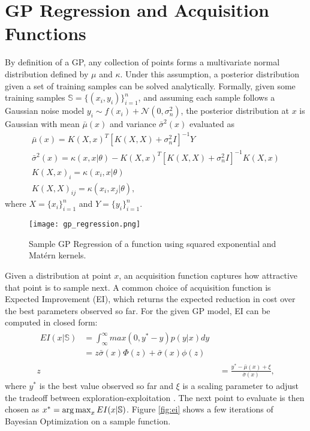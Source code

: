 \section{GP Regression and Acquisition Functions}
\label{gp_acq}
By definition of a GP, any collection of points forms a multivariate normal distribution defined by $\mu$ and $\kappa$. Under this assumption, a posterior distribution given a set of training samples can be solved analytically. Formally, given some training samples $\mathbb{S} = \{(x_i, y_i)\}_{i=1}^n$, and assuming each sample follows a Gaussian noise model $y_i \sim f(x_i) + \mathcal{N}(0, \sigma_n^2)$, the posterior distribution at $x$ is Gaussian with mean $\bar{\mu}(x)$ and variance $\bar{\sigma}^2(x)$ evaluated as
\begin{gather}
  \bar{\mu}(x) = K(X, x)^T[K(X, X) + \sigma_n^2 I]^{-1}Y \\
  \bar{\sigma}^2(x) = \kappa(x, x\vert \theta) - K(X, x)^T[K(X,X) + \sigma_n^2 I]^{-1}K(X,x) \\
  K(X,x)_i = \kappa(x_i, x\vert \theta) \nonumber\\
  K(X,X)_{ij} = \kappa(x_i, x_j\vert \theta) \nonumber,
\end{gather}
where $X = \{x_i\}_{i=1}^n$ and $Y = \{y_i\}_{i=1}^n$. 
\begin{figure}[t]
\centering
\texttt{[image: gp\_regression.png]}
\caption{Sample GP Regression of a function using squared exponential and Matérn kernels.}
\label{fig:gp_regression}
\end{figure}

Given a distribution at point $x$, an acquisition function captures how attractive that point is to sample next. A common choice of acquisition function is Expected Improvement (EI), which returns the expected reduction in cost over the best parameters observed so far. For the given GP model, EI can be computed in closed form: 
\begin{align}
  \begin{split}
  EI(x\vert \mathbb{S}) &= \int_\infty^\infty max(0, y^*-y)p(y\vert x)dy\\
    &= z\bar{\sigma}(x)\Phi(z) + \bar{\sigma}(x)\phi(z)
  \end{split}\\
  z &= \frac{y^* - \bar{\mu}(x) + \xi}{\bar{\sigma}(x)}\nonumber,
\end{align}
where $y^*$ is the best value observed so far and $\xi$ is a scaling parameter to adjust the tradeoff between exploration-exploitation \citep{Lizotte:2008:PBO:1626686}. The next point to evaluate is then chosen as $x^* = \operatorname*{arg\,max}_{x} EI(x \vert \mathbb{S})$. Figure \ref{fig:ei} shows a few iterations of Bayesian Optimization on a sample function.

